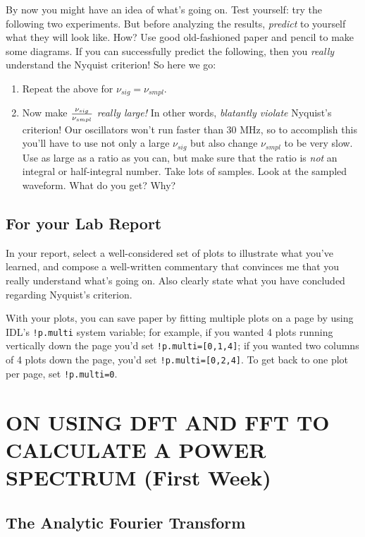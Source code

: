\documentclass[11pt,preprint]{aastex}
\begin{document}
By now you might have an idea of what's going on. Test yourself:
try the following two experiments. But before analyzing the
results, {\it predict} to yourself what they will look like. How? Use
good old-fashioned paper and pencil to make some diagrams. If you can
successfully predict the following, then you {\it really} understand
the Nyquist criterion! So here we go: \begin{enumerate}

\item Repeat the above for $\nu_{sig} = \nu_{smpl}$. 
\item Now make $\nu_{sig} \over \nu_{smpl}$ {\it really {\Large large!}}
	    In other words, {\it blatantly violate} Nyquist's criterion!
	    Our oscillators won't run faster than 30 MHz, so to
	    accomplish this you'll have to use not only a large
	    $\nu_{sig}$ but also change $\nu_{smpl}$ to be very
	    slow. Use as large as a ratio as you can, but make sure that
	    the ratio is {\it not} an integral or half-integral number. Take lots of
	    samples. Look at the sampled waveform.  What do you get?
	    Why?
\end{enumerate}

\subsection{For your Lab Report}

\noindent In your report, select a well-considered set of plots to
illustrate what you've learned, and compose a well-written commentary
that convinces me that you really understand what's going on. Also
clearly state what you have concluded regarding Nyquist's criterion. 

	With your plots, you can save paper by fitting multiple plots on a page
by using IDL's \verb$!p.multi$ system variable; for example, if you
wanted 4 plots running vertically down the page you'd set
\verb$!p.multi=[0,1,4]$; if you wanted two columns of 4 plots down the
page, you'd set {\tt !p.multi=[0,2,4]}.  To get back to one plot per page, set
\verb$!p.multi=0$. 

\section{ ON USING DFT AND FFT TO CALCULATE A POWER SPECTRUM (First Week)} 
\label{pwrspectrum}
 
\subsection{The Analytic Fourier Transform}
\end{document}
